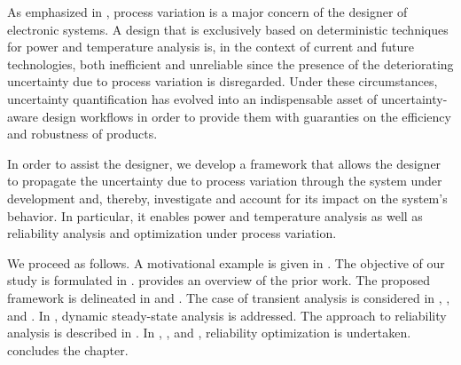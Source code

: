 As emphasized in , process variation is a major
concern of the designer of electronic systems. A design that is exclusively
based on deterministic techniques for power and temperature analysis is, in the
context of current and future technologies, both inefficient and unreliable
since the presence of the deteriorating uncertainty due to process variation is
disregarded. Under these circumstances, uncertainty quantification
\cite{maitre2010} has evolved into an indispensable asset of uncertainty-aware
design workflows in order to provide them with guaranties on the efficiency and
robustness of products.

In order to assist the designer, we develop a framework that allows the designer
to propagate the uncertainty due to process variation through the system under
development and, thereby, investigate and account for its impact on the system's
behavior. In particular, it enables power and temperature analysis as well as
reliability analysis and optimization under process variation.

We proceed as follows. A motivational example is given in .
The objective of our study is formulated in .
 provides an overview of the prior work. The proposed
framework is delineated in  and
. The case of transient analysis is considered
in , , and
. In ,
dynamic steady-state analysis is addressed. The approach to reliability analysis
is described in . In
, , and
, reliability optimization is undertaken.
 concludes the chapter.
